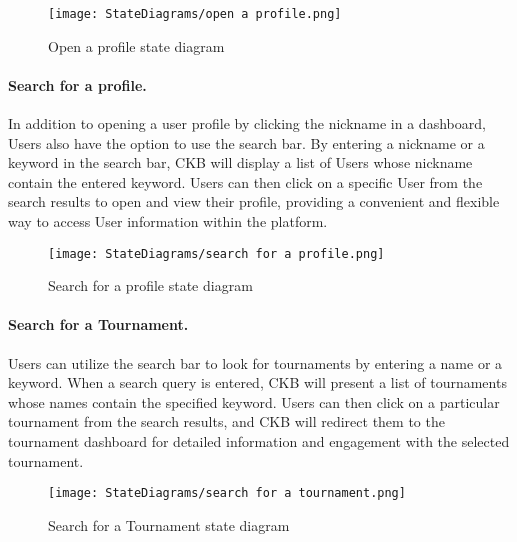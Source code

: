 \begin{figure}[H]
    \begin{center}
        \texttt{[image: StateDiagrams/open a profile.png]}
        \caption{Open a profile state diagram}
        \label{fig:open_profile_sd}%
    \end{center}
\end{figure}

\paragraph{Search for a profile.}
In addition to opening a user profile by clicking the nickname in a dashboard, Users also have the option to use the search bar. By entering a nickname or a keyword in the search bar, CKB will display a list of Users whose nickname contain the entered keyword. Users can then click on a specific User from the search results to open and view their profile, providing a convenient and flexible way to access User information within the platform.

\begin{figure}[H]
    \begin{center}
        \texttt{[image: StateDiagrams/search for a profile.png]}
        \caption{Search for a profile state diagram}
        \label{fig:search_profile_sd}%
    \end{center}
\end{figure}

\paragraph{Search for a Tournament.}
Users can utilize the search bar to look for tournaments by entering a name or a keyword. When a search query is entered, CKB will present a list of tournaments whose names contain the specified keyword. Users can then click on a particular tournament from the search results, and CKB will redirect them to the tournament dashboard for detailed information and engagement with the selected tournament. 

\begin{figure}[H]
    \begin{center}
        \texttt{[image: StateDiagrams/search for a tournament.png]}
        \caption{Search for a Tournament state diagram}
        \label{fig:search_tournament_sd}%
    \end{center}
\end{figure}

